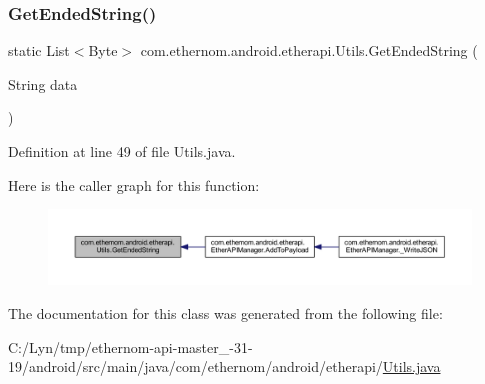 \subsubsection{\texorpdfstring{Get\+Ended\+String()}{GetEndedString()}}
{\footnotesize\ttfamily static List$<$Byte$>$ com.\+ethernom.\+android.\+etherapi.\+Utils.\+Get\+Ended\+String (\begin{DoxyParamCaption}\item[{String}]{data }\end{DoxyParamCaption})\hspace{0.3cm}{\ttfamily [static]}}



Definition at line 49 of file Utils.\+java.

Here is the caller graph for this function\+:\nopagebreak
\begin{figure}[H]
\begin{center}
\leavevmode
\includegraphics[width=350pt]{classcom_1_1ethernom_1_1android_1_1etherapi_1_1_utils_a5ba18811e4d78758336b140c58f2683f_icgraph}
\end{center}
\end{figure}


The documentation for this class was generated from the following file\+:\begin{DoxyCompactItemize}
\item 
C\+:/\+Lyn/tmp/ethernom-\/api-\/master\+\_-\/31-\/19/android/src/main/java/com/ethernom/android/etherapi/\mbox{\hyperlink{_utils_8java}{Utils.\+java}}\end{DoxyCompactItemize}
